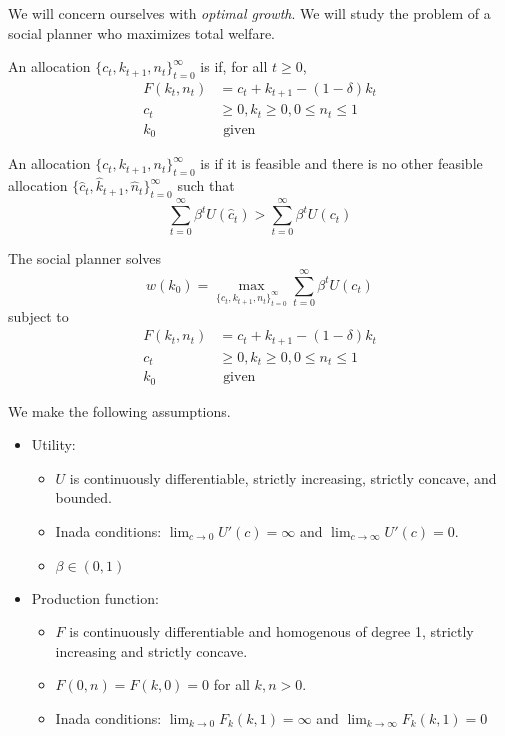 \documentclass[10pt]{article}
\begin{document}
We will concern ourselves with \emph{optimal growth}. We will study the problem of a social planner who maximizes total welfare. 

\begin{definition}
	An allocation $\{c_t,k_{t+1},n_t\}_{t=0}^\infty$ is  if, for all $t \ge 0$,
	\begin{align*}
		F(k_t,n_t) &= c_t + k_{t+1} - (1-\delta)k_t \\
		c_t &\ge 0 , k_t \ge 0, 0 \le n_t \le 1 \\
		k_0 &\text{ given}
	\end{align*}
\end{definition}

\begin{definition}
	An allocation $\{c_t,k_{t+1},n_t\}_{t=0}^\infty$ is  if it is feasible and there is no other feasible allocation $\{\hat{c}_t,\hat{k}_{t+1},\hat{n}_t\}_{t=0}^\infty$ such that
	\[
	\sum_{t=0}^\infty \beta^t U(\hat{c}_t) > \sum_{t=0}^\infty \beta^t U(c_t)
	\]
\end{definition}

The social planner solves
\[
w(k_0) = \max_{\{c_t,k_{t+1},n_t\}_{t=0}^\infty}\sum_{t=0}^\infty \beta^t U(c_t)
\]
subject to
\begin{align*}
		F(k_t,n_t) &= c_t + k_{t+1} - (1-\delta)k_t \\
		c_t &\ge 0 , k_t \ge 0, 0 \le n_t \le 1 \\
		k_0 &\text{ given}
\end{align*}

We make the following assumptions.
\begin{itemize}
	\item Utility:
	\begin{itemize}
		\item $U$ is continuously differentiable, strictly increasing, strictly concave, and bounded.
		\item Inada conditions: $\lim_{c\to 0} U'(c) = \infty$ and $\lim_{c\to\infty} U'(c) = 0$.
		\item $\beta \in (0,1)$
	\end{itemize}
	\item Production function:
	\begin{itemize}
		\item $F$ is continuously differentiable and homogenous of degree 1, strictly increasing and strictly concave.
		\item $F(0,n) = F(k,0) = 0$ for all $k,n > 0$.
		\item Inada conditions: $\lim_{k\to0} F_k(k,1) = \infty$ and $\lim_{k\to\infty} F_k(k,1) = 0$
	\end{itemize}
\end{itemize}
\end{document}
